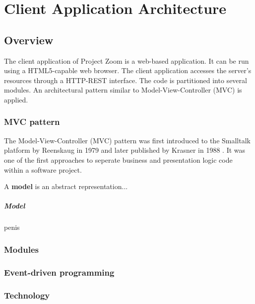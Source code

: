 \chapter{Client Application Architecture}

\section{Overview}
The client application of Project Zoom is a web-based application. It can be run using a HTML5-capable web browser. The client application accesses the server's resources through a HTTP-REST interface. The code is partitioned into several modules. An architectural pattern similar to Model-View-Controller (MVC) is applied.

\subsection{MVC pattern}
The Model-View-Controller (MVC) pattern was first introduced to the Smalltalk platform by Reenskaug in 1979 \cite{Reenskaug_1979} and later published by Krasner in 1988 \cite{Krasner_1988}. It was one of the first approaches to seperate business and presentation logic code within a software project.

A \textbf{model} is an abstract representation...
\paragraph{Model} penis

\subsection{Modules}

\subsection{Event-driven programming}

\cite{faison_2011}

\subsection{Technology}

